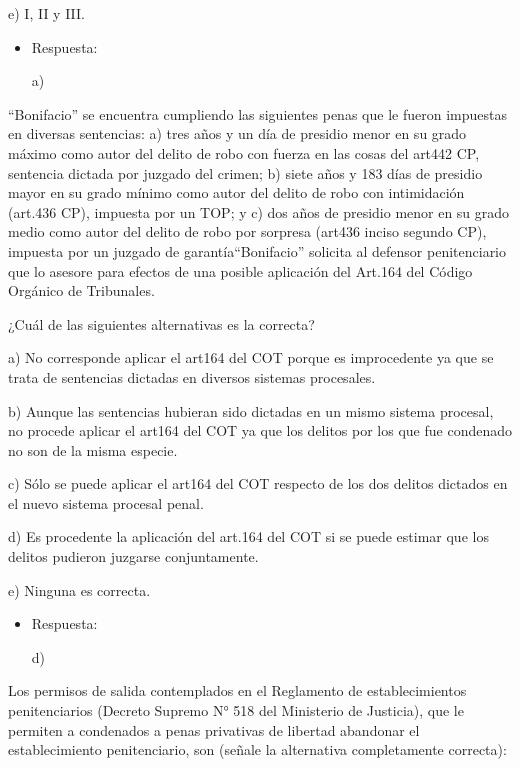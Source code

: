 \documentclass[letterpaper, 11pt]{article}
\begin{document}
e) I, II y III.


\begin{itemize}
\item Respuesta:

a)
\end{itemize}



“Bonifacio” se encuentra cumpliendo las siguientes penas que le fueron
impuestas en diversas sentencias: a) tres años y un día de presidio
menor en su grado máximo como autor del delito de robo con fuerza en
las cosas del art442 CP, sentencia dictada por juzgado del crimen; b)
siete años y 183 días de presidio mayor en su grado mínimo como autor
del delito de robo con intimidación (art.436 CP), impuesta por un TOP;
y c) dos años de presidio menor en su grado medio como autor del
delito de robo por sorpresa (art436 inciso segundo CP), impuesta por
un juzgado de garantía“Bonifacio” solicita al defensor penitenciario
que lo asesore para efectos de una posible aplicación del Art.164 del
Código Orgánico de Tribunales.

¿Cuál de las siguientes alternativas es la correcta?

a) No corresponde aplicar el art164 del COT porque es improcedente ya
que se trata de sentencias dictadas en diversos sistemas procesales.

b) Aunque las sentencias hubieran sido dictadas en un mismo sistema
procesal, no procede aplicar el art164 del COT ya que los delitos por
los que fue condenado no son de la misma especie.

c) Sólo se puede aplicar el art164 del COT respecto de los dos delitos
dictados en el nuevo sistema procesal penal.

d) Es procedente la aplicación del art.164 del COT si se puede estimar
que los delitos pudieron juzgarse conjuntamente.

e) Ninguna es correcta.


\begin{itemize}
\item Respuesta:

d)
\end{itemize}


Los permisos de salida contemplados en el Reglamento de
establecimientos penitenciarios (Decreto Supremo N° 518 del Ministerio
de Justicia), que le permiten a condenados a penas privativas de
libertad abandonar el establecimiento penitenciario, son (señale la
alternativa completamente correcta):
\end{document}
